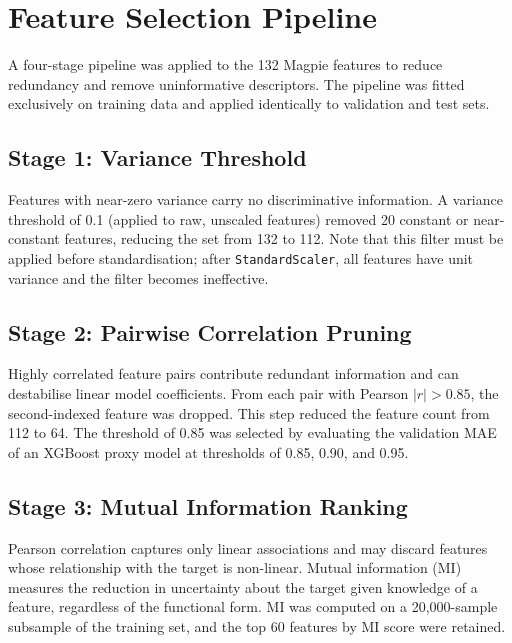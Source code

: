 \documentclass[conference]{IEEEtran}
\begin{document}
\section{Feature Selection Pipeline}

A four-stage pipeline was applied to the 132 Magpie features to reduce redundancy and remove uninformative descriptors. The pipeline was fitted exclusively on training data and applied identically to validation and test sets.

\subsection{Stage 1: Variance Threshold}

Features with near-zero variance carry no discriminative information. A variance threshold of 0.1 (applied to raw, unscaled features) removed 20 constant or near-constant features, reducing the set from 132 to 112. Note that this filter must be applied before standardisation; after \texttt{StandardScaler}, all features have unit variance and the filter becomes ineffective.

\subsection{Stage 2: Pairwise Correlation Pruning}

Highly correlated feature pairs contribute redundant information and can destabilise linear model coefficients. From each pair with Pearson $|r| > 0.85$, the second-indexed feature was dropped. This step reduced the feature count from 112 to 64. The threshold of 0.85 was selected by evaluating the validation MAE of an XGBoost proxy model at thresholds of 0.85, 0.90, and 0.95.

\subsection{Stage 3: Mutual Information Ranking}

Pearson correlation captures only linear associations and may discard features whose relationship with the target is non-linear. Mutual information (MI) \cite{kraskov2004} measures the reduction in uncertainty about the target given knowledge of a feature, regardless of the functional form. MI was computed on a 20,000-sample subsample of the training set, and the top 60 features by MI score were retained.
\end{document}
